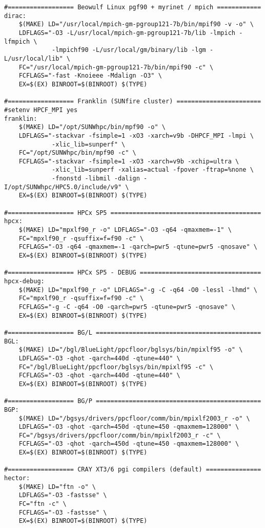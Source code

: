 \begin{verbatim}
#================== Beowulf Linux pgf90 + myrinet / mpich ============
dirac:
	$(MAKE) LD="/usr/local/mpich-gm-pgroup121-7b/bin/mpif90 -v -o" \
	LDFLAGS="-O3 -L/usr/local/mpich-gm-pgroup121-7b/lib -lmpich -lfmpich \
	         -lmpichf90 -L/usr/local/gm/binary/lib -lgm -L/usr/local/lib" \
	FC="/usr/local/mpich-gm-pgroup121-7b/bin/mpif90 -c" \
	FCFLAGS="-fast -Knoieee -Mdalign -O3" \
	EX=$(EX) BINROOT=$(BINROOT) $(TYPE)

#================== Franklin (SUNfire cluster) =======================
#setenv HPCF_MPI yes
franklin:
	$(MAKE) LD="/opt/SUNWhpc/bin/mpf90 -o" \
	LDFLAGS="-stackvar -fsimple=1 -xO3 -xarch=v9b -DHPCF_MPI -lmpi \
	         -xlic_lib=sunperf" \
	FC="/opt/SUNWhpc/bin/mpf90 -c" \
	FCFLAGS="-stackvar -fsimple=1 -xO3 -xarch=v9b -xchip=ultra \
	         -xlic_lib=sunperf -xalias=actual -fpover -ftrap=%none \
	         -fnonstd -libmil -dalign -I/opt/SUNWhpc/HPC5.0/include/v9" \
	EX=$(EX) BINROOT=$(BINROOT) $(TYPE)

#================== HPCx SP5 =========================================
hpcx:
	$(MAKE) LD="mpxlf90_r -o" LDFLAGS="-O3 -q64 -qmaxmem=-1" \
	FC="mpxlf90_r -qsuffix=f=f90 -c" \
	FCFLAGS="-O3 -q64 -qmaxmem=-1 -qarch=pwr5 -qtune=pwr5 -qnosave" \
	EX=$(EX) BINROOT=$(BINROOT) $(TYPE)

#================== HPCx SP5 - DEBUG =================================
hpcx-debug:
	$(MAKE) LD="mpxlf90_r -o" LDFLAGS="-g -C -q64 -O0 -lessl -lhmd" \
	FC="mpxlf90_r -qsuffix=f=f90 -c" \
	FCFLAGS="-g -C -q64 -O0 -qarch=pwr5 -qtune=pwr5 -qnosave" \
	EX=$(EX) BINROOT=$(BINROOT) $(TYPE)

#================== BG/L =============================================
BGL:
	$(MAKE) LD="/bgl/BlueLight/ppcfloor/bglsys/bin/mpixlf95 -o" \
	LDFLAGS="-O3 -qhot -qarch=440d -qtune=440" \
	FC="/bgl/BlueLight/ppcfloor/bglsys/bin/mpixlf95 -c" \
	FCFLAGS="-O3 -qhot -qarch=440d -qtune=440" \
	EX=$(EX) BINROOT=$(BINROOT) $(TYPE)

#================== BG/P =============================================
BGP:
	$(MAKE) LD="/bgsys/drivers/ppcfloor/comm/bin/mpixlf2003_r -o" \
	LDFLAGS="-O3 -qhot -qarch=450d -qtune=450 -qmaxmem=128000" \
	FC="/bgsys/drivers/ppcfloor/comm/bin/mpixlf2003_r -c" \
	FCFLAGS="-O3 -qhot -qarch=450d -qtune=450 -qmaxmem=128000" \
	EX=$(EX) BINROOT=$(BINROOT) $(TYPE)

#================== CRAY XT3/6 pgi compilers (default) ===============
hector:
	$(MAKE) LD="ftn -o" \
	LDFLAGS="-O3 -fastsse" \
	FC="ftn -c" \
	FCFLAGS="-O3 -fastsse" \
	EX=$(EX) BINROOT=$(BINROOT) $(TYPE)


\end{verbatim}
